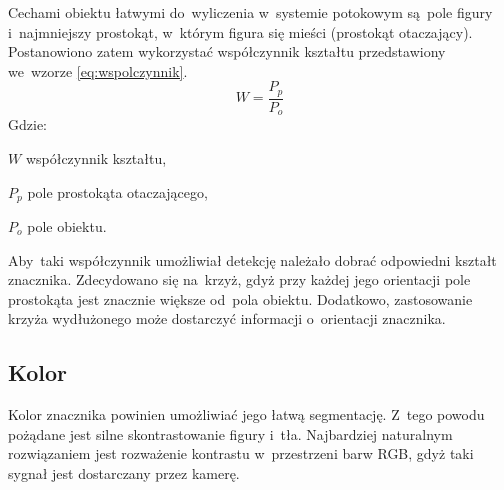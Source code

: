 Cechami obiektu łatwymi do~wyliczenia w~systemie potokowym są~pole figury i~najmniejszy prostokąt, w~którym figura się mieści (prostokąt otaczający). 
Postanowiono zatem wykorzystać współczynnik kształtu przedstawiony we~wzorze \ref{eq:wspolczynnik}.\\
\begin{equation} \label{eq:wspolczynnik}
W=\frac{P_p}{P_o}
\end{equation}
Gdzie:
\begin{eqwhere}[2cm]
	\item[$W$] współczynnik kształtu,
	\item[$P_p$] pole prostokąta otaczającego,
	\item[$P_o$] pole obiektu.
\end{eqwhere}
Aby~taki współczynnik umożliwiał detekcję należało dobrać odpowiedni kształt znacznika. 
Zdecydowano się na~krzyż, gdyż przy każdej jego orientacji pole prostokąta jest znacznie większe od~pola obiektu. 
Dodatkowo, zastosowanie krzyża wydłużonego może dostarczyć informacji o~orientacji znacznika.
\subsection{Kolor}
\label{subsec:kolor}

Kolor znacznika powinien umożliwiać jego łatwą segmentację. 
Z~tego powodu pożądane jest silne skontrastowanie figury i~tła. 
Najbardziej naturalnym rozwiązaniem jest rozważenie kontrastu w~przestrzeni barw RGB, gdyż taki sygnał jest dostarczany przez kamerę.

